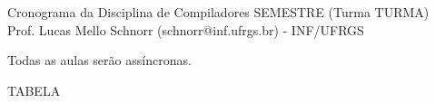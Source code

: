 \documentclass[11pt,portuguese,]{article}
\begin{document}
\begin{center}
  {\LARGE Cronograma da Disciplina de Compiladores SEMESTRE (Turma TURMA)} \\
  Prof. Lucas Mello Schnorr (schnorr@inf.ufrgs.br) - INF/UFRGS
\end{center}

\begin{center}
  Todas as aulas serão assíncronas.
\end{center}

TABELA

\end{document}
